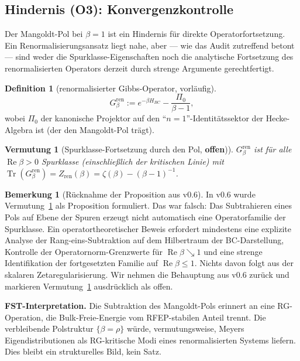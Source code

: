 \documentclass[11pt,a4paper]{article}
\theoremstyle{plain}
\newtheorem{conjecture}[theorem]{Vermutung}
\theoremstyle{definition}
\newtheorem{definition}[theorem]{Definition}
\newtheorem{remark}[theorem]{Bemerkung}
\DeclareMathOperator{\Tr}{Tr}
\renewcommand{\Re}{\operatorname{Re}}
\begin{document}
\subsection{Hindernis (O3): Konvergenzkontrolle}

Der Mangoldt-Pol bei $\beta = 1$ ist ein Hindernis für direkte
Operatorfortsetzung. Ein Renormalisierungsansatz liegt nahe, aber --- wie
das Audit zutreffend betont --- sind weder die Spurklasse-Eigenschaften
noch die analytische Fortsetzung des renormalisierten Operators derzeit
durch strenge Argumente gerechtfertigt.

\begin{definition}[renormalisierter Gibbs-Operator, vorläufig]
\label{def:ren-gibbs}
\[
  G_\beta^{\mathrm{ren}} := e^{-\beta H_{BC}}
    - \frac{\Pi_0}{\beta - 1},
\]
wobei $\Pi_0$ der kanonische Projektor auf den
``$n = 1$''-Identitätssektor der Hecke-Algebra ist (der den
Mangoldt-Pol trägt).
\end{definition}

\begin{conjecture}[Spurklasse-Fortsetzung durch den Pol,
\textbf{offen})]
\label{conj:ren-trace-class}
$G_\beta^{\mathrm{ren}}$ ist für alle $\Re\beta > 0$ Spurklasse
(einschließlich der kritischen Linie) mit
$\Tr(G_\beta^{\mathrm{ren}}) = Z_{\mathrm{ren}}(\beta) = \zeta(\beta)
- (\beta - 1)^{-1}$.
\end{conjecture}

\begin{remark}[Rücknahme der Proposition aus v0.6]
\label{rem:o3-retraction}
In v0.6 wurde Vermutung~\ref{conj:ren-trace-class} als Proposition
formuliert. Das war falsch: Das Subtrahieren eines Pols auf Ebene der
Spuren erzeugt nicht automatisch eine Operatorfamilie der Spurklasse.
Ein operatortheoretischer Beweis erfordert mindestens eine explizite
Analyse der Rang-eins-Subtraktion auf dem Hilbertraum der BC-Darstellung,
Kontrolle der Operatornorm-Grenzwerte für $\Re\beta \searrow 1$ und eine
strenge Identifikation der fortgesetzten Familie auf $\Re\beta \le 1$.
Nichts davon folgt aus der skalaren Zetaregularisierung. Wir nehmen die
Behauptung aus v0.6 zurück und markieren Vermutung~\ref{conj:ren-trace-class}
ausdrücklich als offen.
\end{remark}

\textbf{FST-Interpretation.} Die Subtraktion des Mangoldt-Pols erinnert
an eine RG-Operation, die Bulk-Freie-Energie vom RFEP-stabilen Anteil
trennt. Die verbleibende Polstruktur $\{\beta = \rho\}$ würde, vermutungsweise,
Meyers Eigendistributionen als RG-kritische Modi eines renormalisierten
Systems liefern. Dies bleibt ein strukturelles Bild, kein Satz.
\end{document}
